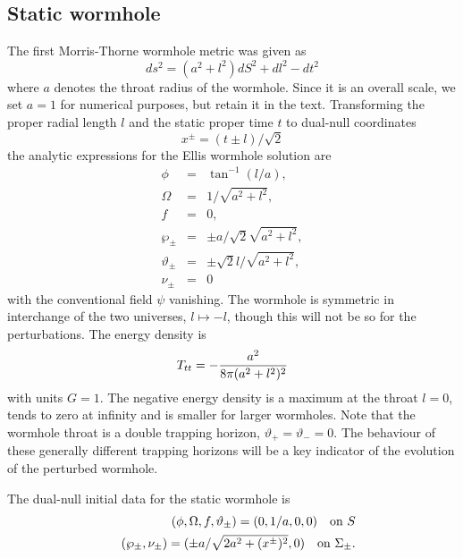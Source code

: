 \documentclass[aps,showpacs,twocolumn,draft,eqsecnum]{revtex4}
\begin{document}
\subsection{Static wormhole}
The first Morris-Thorne wormhole metric \cite{MT} was given as
\begin{equation}
ds^2=(a^2+l^2)dS^2+dl^2-dt^2
\end{equation}
where $a$ denotes the throat radius of the wormhole. Since it is an overall
scale, we set $a=1$ for numerical purposes, but retain it in the text.
Transforming the proper radial length $l$ and the static proper time $t$ to
dual-null coordinates
\begin{equation}
x^\pm=(t\pm l)/\sqrt2
\end{equation}
the analytic expressions for the Ellis wormhole solution \cite{E} are
\begin{eqnarray}
\phi&=&\tan^{-1}(l/a),\\
\Omega&=&1/\sqrt{a^2+l^2},\\
f&=&0,\\
\wp_\pm&=&\pm a/\sqrt2\sqrt{a^2+l^2},\\
\vartheta_\pm&=&\pm \sqrt2l/\sqrt{a^2+l^2},\\
\nu_\pm&=&0 \label{EllisWH2}
\end{eqnarray}
with the conventional field $\psi$ vanishing. The wormhole is symmetric in
interchange of the two universes, $l\mapsto-l$, though this will not be so for
the perturbations. The energy density is
\begin{equation}
T_{tt}=-{a^2\over{8\pi(a^2+l^2)^2}}
\end{equation}
with units $G=1$. The negative energy density is a maximum at the throat $l=0$,
tends to zero at infinity and is smaller for larger wormholes. Note that the
wormhole throat is a double trapping horizon, $\vartheta_+=\vartheta_-=0$. The
behaviour of these generally different trapping horizons will be a key
indicator of the evolution of the perturbed wormhole.

The dual-null initial data for the static wormhole is
\begin{eqnarray}
&&(\phi,\Omega,f,\vartheta_\pm)=(0,1/a,0,0) \quad\hbox{on $S$} \\
&&(\wp_\pm,\nu_\pm)=(\pm a/\sqrt{2a^2+(x^\pm)^2},0)\quad\hbox{on $\Sigma_\pm$}.
\end{eqnarray}

\end{document}
